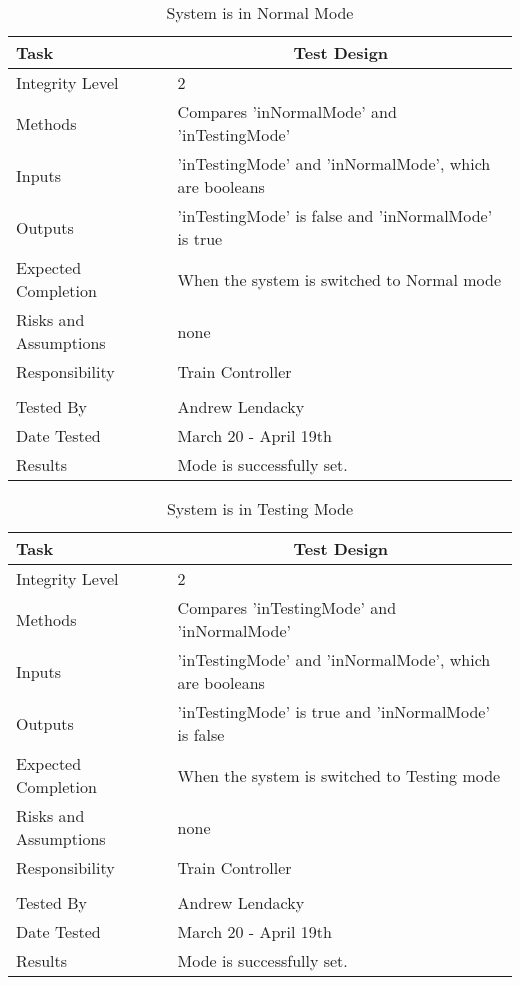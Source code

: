 \documentclass[]{article}
\begin{document}
\begin{table}[H]
	\centering
	\caption{System is in Normal Mode}
	\begin{tabular}{|l|l|}
		\hline
		Task & \multicolumn{1}{c|}{Test Design} \\ \hline
		Integrity Level & 2\\ \hline
		Methods & Compares 'inNormalMode' and 'inTestingMode'\\ \hline
		Inputs & 'inTestingMode' and 'inNormalMode', which are booleans\\ \hline
		Outputs & 'inTestingMode' is false and 'inNormalMode' is true \\ \hline
		Expected Completion & When the system is switched to Normal mode\\ \hline
		Risks and Assumptions & none\\ \hline
		Responsibility & Train Controller\\ \hline
			\\ \hline
		Tested By   &  Andrew Lendacky\\	\hline
		Date Tested & \parbox[t]{10cm}{March 20 - April 19th}\\ \hline
		Results & Mode is successfully set.\\ \hline
	\end{tabular}
\end{table}

\begin{table}[H]
	\centering
	\caption{System is in Testing Mode}
	\begin{tabular}{|l|l|}
		\hline
		Task & \multicolumn{1}{c|}{Test Design} \\ \hline
		Integrity Level & 2 \\ \hline
		Methods & Compares 'inTestingMode' and 'inNormalMode'\\ \hline
		Inputs & 'inTestingMode' and 'inNormalMode', which are booleans\\ \hline
		Outputs & 'inTestingMode' is true and 'inNormalMode'  is false\\ \hline
		Expected Completion & When the system is switched to Testing mode\\ \hline
		Risks and Assumptions & none\\ \hline
		Responsibility & Train Controller\\ \hline
			\\ \hline
		Tested By   &  Andrew Lendacky\\	\hline
		Date Tested & \parbox[t]{10cm}{March 20 - April 19th}\\ \hline
		Results & Mode is successfully set. \\ \hline
	\end{tabular}
\end{table}
\end{document}
